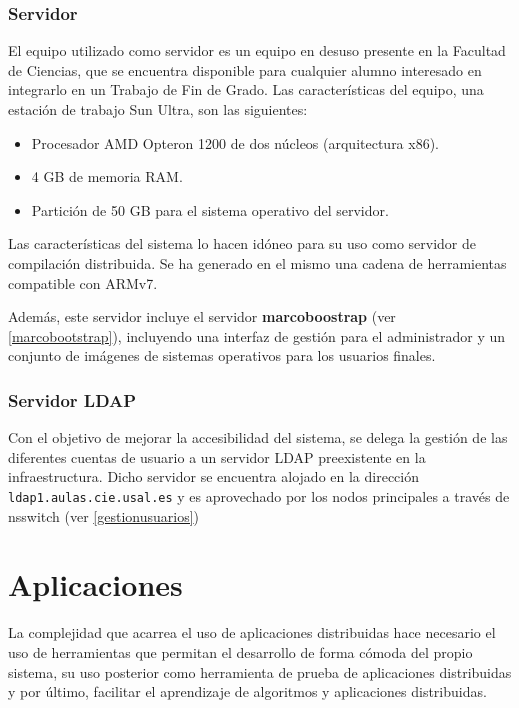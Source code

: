 \subsubsection{Servidor}

El equipo utilizado como servidor es un equipo en desuso presente en la Facultad de Ciencias, que se encuentra disponible para cualquier alumno interesado en integrarlo en un Trabajo de Fin de Grado. Las características del equipo, una estación de trabajo Sun Ultra, son las siguientes:

\begin{itemize}
	\item Procesador AMD Opteron 1200 de dos núcleos (arquitectura x86).
	\item 4 GB de memoria RAM.
	\item Partición de 50 GB para el sistema operativo del servidor.
\end{itemize}

Las características del sistema lo hacen idóneo para su uso como servidor de compilación distribuida. Se ha generado en el mismo una cadena de herramientas compatible con ARMv7.%

Además, este servidor incluye el servidor \textbf{marcoboostrap} (ver \ref{marcobootstrap}), incluyendo una interfaz de gestión para el administrador y un conjunto de imágenes de sistemas operativos para los usuarios finales.

\subsubsection{Servidor LDAP}

Con el objetivo de mejorar la accesibilidad del sistema, se delega la gestión de las diferentes cuentas de usuario a un servidor LDAP preexistente en la infraestructura. Dicho servidor se encuentra alojado en la dirección \texttt{ldap1.aulas.cie.usal.es} y es aprovechado por los nodos principales a través de nsswitch (ver \ref{gestionusuarios}) 


\section{Aplicaciones}

La complejidad que acarrea el uso de aplicaciones distribuidas hace necesario el uso de herramientas que permitan el desarrollo de forma cómoda del propio sistema, su uso posterior como herramienta de prueba de aplicaciones distribuidas y por último, facilitar el aprendizaje de algoritmos y aplicaciones distribuidas.

